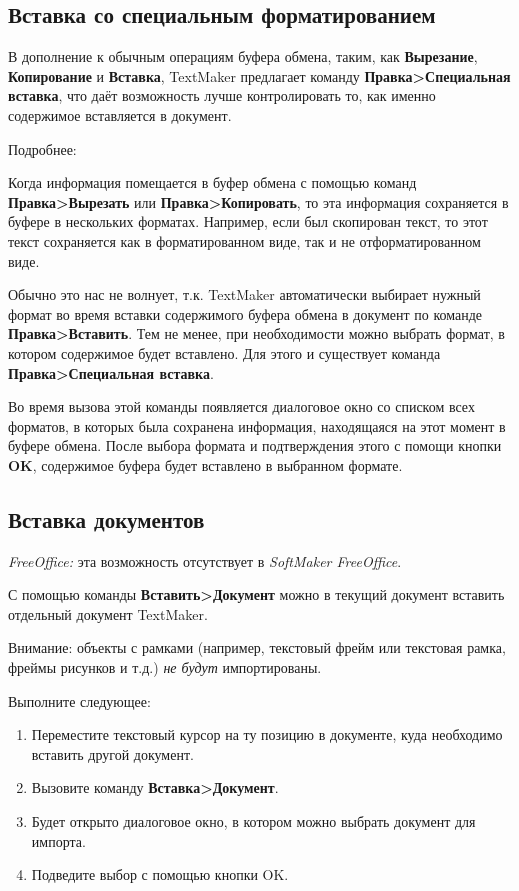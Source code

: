 \documentclass[a4paper,10pt]{article}
\begin{document}
\subsection{Вставка со специальным форматированием}
В дополнение к обычным операциям буфера обмена, таким, как \textbf{Вырезание}, \textbf{Копирование} и \textbf{Вставка}, TextMaker предлагает команду \textbf{Правка>Специальная вставка}, что даёт возможность лучше контролировать то, как именно содержимое вставляется в документ.

Подробнее:

Когда информация помещается в буфер обмена с помощью команд \textbf{Правка>Вырезать} или \textbf{Правка>Копировать}, то эта информация сохраняется в буфере в нескольких форматах. Например, если был скопирован текст, то этот текст сохраняется как в форматированном виде, так и не отформатированном виде.

Обычно это нас не волнует, т.к. TextMaker автоматически выбирает нужный формат во время вставки содержимого буфера обмена в документ по команде \textbf{Правка>Вставить}. Тем не менее, при необходимости можно выбрать формат, в котором содержимое будет вставлено. Для этого и существует команда \textbf{Правка>Специальная вставка}.

Во время вызова этой команды появляется диалоговое окно со списком всех форматов, в которых была сохранена информация, находящаяся на этот момент в буфере обмена. После выбора формата и подтверждения этого с помощи кнопки \textbf{OK}, содержимое буфера будет вставлено в выбранном формате.

\subsection{Вставка документов}
\begin{mdframed}[backgroundcolor=pink!50]
\textit{FreeOffice:} эта возможность отсутствует в \textit{SoftMaker FreeOffice}.
\end{mdframed}

С помощью команды \textbf{Вставить>Документ} можно в текущий документ вставить отдельный документ TextMaker.

Внимание: объекты с рамками (например, текстовый фрейм или текстовая рамка, фреймы рисунков и т.д.) \textit{не будут} импортированы.

Выполните следующее:
\begin{enumerate}
 \item Переместите текстовый курсор на ту позицию в документе, куда необходимо вставить другой документ.
 \item Вызовите команду \textbf{Вставка>Документ}.
 \item Будет открыто диалоговое окно, в котором можно выбрать документ для импорта.
 \item Подведите выбор с помощью кнопки OK.
\end{enumerate}
\end{document}
